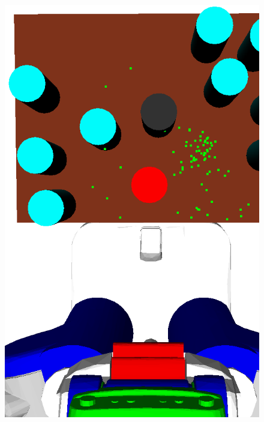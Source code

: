 \begin{figure}[t]
  \centering
    \noindent
    \includegraphics[scale=0.13]{images/grasp_context_1.png}

\end{figure}
